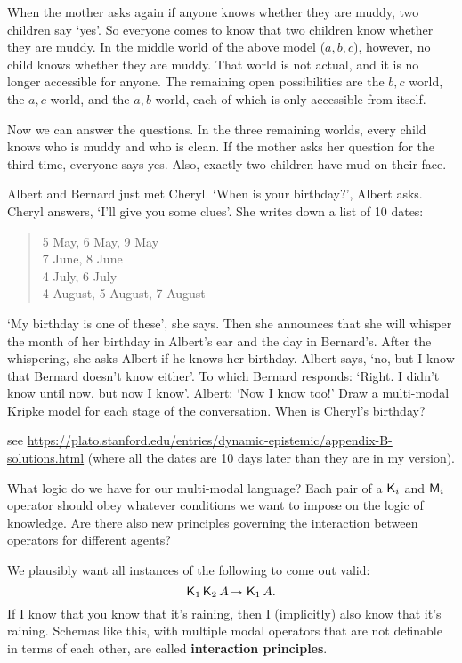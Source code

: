 When the mother asks again if anyone knows whether they are muddy, two children
say `yes'. So everyone comes to know that two children know whether they are
muddy. In the middle world of the above model ($a,b,c$), however, no child
knows whether they are muddy. That world is not actual, and it is no longer
accessible for anyone. The remaining open possibilities are the $b,c$ world, the
$a,c$ world, and the $a,b$ world, each of which is only accessible from itself.

Now we can answer the questions. In the three remaining worlds, every child
knows who is muddy and who is clean. If the mother asks her question for the
third time, everyone says yes. Also, exactly two children have mud on their
face.

\begin{exercise}
  Albert and Bernard just met Cheryl. `When is your birthday?', Albert asks.
  Cheryl answers, `I'll give you some clues'. She writes down a list of 10
  dates:
  \begin{quote}
    5 May, 6 May, 9 May\\
    7 June, 8 June\\
    4 July, 6 July\\
    4 August, 5 August, 7 August
  \end{quote}
  `My birthday is one of these', she says. Then she announces that she will
  whisper the month of her birthday in Albert's ear and the day in Bernard's.
  After the whispering, she asks Albert if he knows her birthday. Albert says,
  `no, but I know that Bernard doesn't know either'. To which Bernard responds:
  `Right. I didn't know until now, but now I know'. Albert: `Now I know too!'
  Draw a multi-modal Kripke model for each stage of the conversation. When is
  Cheryl's birthday?
\end{exercise}
\begin{solution}
  see
  \href{https://plato.stanford.edu/entries/dynamic-epistemic/appendix-B-solutions.html}{https://plato.stanford.edu/entries/dynamic-epistemic/appendix-B-solutions.html} (where all the dates are 10 days later than they are in my version).
\end{solution}

What logic do we have for our multi-modal language? Each pair of a $\operatorname{\mathsf{K}{}}_{i}$ and
$\operatorname{\mathsf{M}}_{i}$ operator should obey whatever conditions we want to impose on the
logic of knowledge. Are there also new principles governing the interaction
between operators for different agents?

We plausibly want all instances of the following to come out valid:
\[
  \Kn_1 \Kn_2 A \to \Kn_1 A.
\]
If I know that you know that it's raining, then I (implicitly) also know that
it's raining. Schemas like this, with multiple modal operators that are
not definable in terms of each other, are called \textbf{interaction
  principles}.

